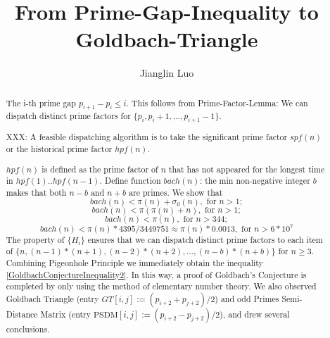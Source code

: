 \documentclass[12pt,a4paper,reqno]{amsart}
\numberwithin{equation}{section}
\theoremstyle{plain}
\theoremstyle{definition}
\begin{document}
	
	\title{From Prime-Gap-Inequality to Goldbach-Triangle}
	
	\author{Jianglin Luo}
	\address{WangYueHu Community 1-pian 7-dong, Changsha, China 230026.}
	
	
	
	\begin{abstract}
		The i-th prime gap $p_{i+1}-p_{i}\leq i$. This follows from 
		Prime-Factor-Lemma: We can dispatch distinct prime factors for 
		$\{p_i,p_i+1,\dots,p_{i+1}-1\}$. 
		
		XXX: A feasible dispatching algorithm 
		is to take the significant prime factor $spf(n)$ or the historical prime factor $hpf(n)$. 

		$hpf(n)$ is defined as the prime factor of $n$ that has not appeared for the 
		longest time in $hpf(1)..hpf(n-1)$. 
		Define function $bach(n)$: the min non-negative integer $b$ makes 
		that both $n-b$ and $n+b$ are primes. We show that 
	\begin{equation}\label{GoldbachConjectureInequality1}
		bach(n) < \pi(n)+\sigma_0(n) ,\text{ for } n>1;
	\end{equation}
	\begin{equation}\label{GoldbachConjectureInequality2}
		bach(n) < \pi(\pi(n)+n) ,\text{ for }  n>1;
	\end{equation}
	\begin{equation}\label{GoldbachConjectureInequality3}
		bach(n) < \pi(n), \text{ for } n>344; 
	\end{equation}
	\begin{equation}\label{GCInequality4}
		bach(n) < \pi(n)*4395/3449751\approx\pi(n)*0.0013,\text{ for } n>6*10^7
	\end{equation}
	The property of $\{H_i\}$ ensures that we can dispatch distinct prime 
	factors to each item of  
	$\{n,(n-1)*(n+1),(n-2)*(n+2),\dots,(n-b)*(n+b)\}$ for $n \geq 3$. 
	Combining Pigeonhole Principle we immediately obtain 
	the inequality \eqref{GoldbachConjectureInequality2}. In this way, 
	a proof of Goldbach's Conjecture is completed by only using the method 
	of elementary number theory. We also observed Goldbach Triangle 
	(entry $GT[i,j]:=(p_{i+2}+p_{j+2})/2$) and odd Primes Semi-Distance Matrix
	(entry $\text{PSDM}[i,j]:=(p_{i+2}-p_{j+2})/2$), and drew several conclusions.
	
	\end{abstract}
	
	\maketitle
	
\end{document}
